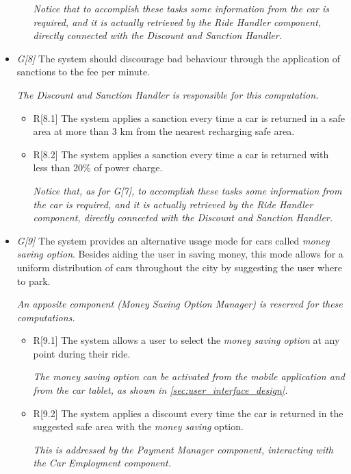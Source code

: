 \begin{itemize}
\begin{itemize}
			\textit{Notice that to accomplish these tasks some information from the car is required, and it is actually retrieved by the Ride Handler component, directly connected with the Discount and Sanction Handler. }
	\end{itemize}
	
\item \textit{G[8]} The system should discourage bad behaviour through the application of sanctions to the fee per minute.

	\textit{The Discount and Sanction Handler is responsible for this computation.}

	\begin{itemize}
		\item R[8.1] The system applies a sanction every time a car is returned in a safe area at more than 3 km from the nearest recharging safe area.
		\item R[8.2] The system applies a sanction every time a car is returned with less than 20\% of power charge.

			\textit{Notice that, as for G[7], to accomplish these tasks some information from the car is required, and it is actually retrieved by the Ride Handler component, directly connected with the Discount and Sanction Handler. }
	\end{itemize}
	
\item \textit{G[9]} The system provides an alternative usage mode for cars called \textit{money saving option}. Besides aiding the user in saving money, this mode allows for a uniform distribution of cars throughout the city by suggesting the user where to park.

	\textit{An apposite component (Money Saving Option Manager) is reserved for these computations.}

	\begin{itemize}
		\item R[9.1] The system allows a user to select the \textit{money saving option} at any point during their ride.

			\textit{The money saving option can be activated from the mobile application and from the car tablet, as shown in \autoref{sec:user_interface_design}.}

		\item R[9.2] The system applies a discount every time the car is returned in the suggested safe area with the \textit{money saving} option.

			\textit{This is addressed by the Payment Manager component, interacting with the Car Employment component.}


\end{itemize}
\end{itemize}
